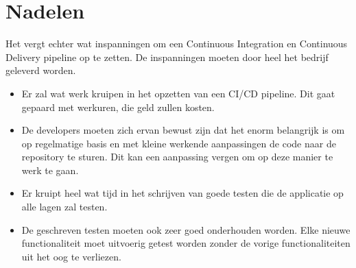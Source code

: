 \section{Nadelen}
\label{sec:nadelen}
Het vergt echter wat inspanningen om een Continuous Integration en Continuous Delivery pipeline op te zetten. De inspanningen moeten door heel het bedrijf geleverd worden.
\begin{itemize}
    \item Er zal wat werk kruipen in het opzetten van een CI/CD pipeline. Dit gaat gepaard met werkuren, die geld zullen kosten.
    \item De developers moeten zich ervan bewust zijn dat het enorm belangrijk is om op regelmatige basis en met kleine werkende aanpassingen de code naar de repository te sturen. Dit kan een aanpassing vergen om op deze manier te werk te gaan.
    \item Er kruipt heel wat tijd in het schrijven van goede testen die de applicatie op alle lagen zal testen.
    \item De geschreven testen moeten ook zeer goed onderhouden worden. Elke nieuwe functionaliteit moet uitvoerig getest worden zonder de vorige functionaliteiten uit het oog te verliezen.
\end{itemize}